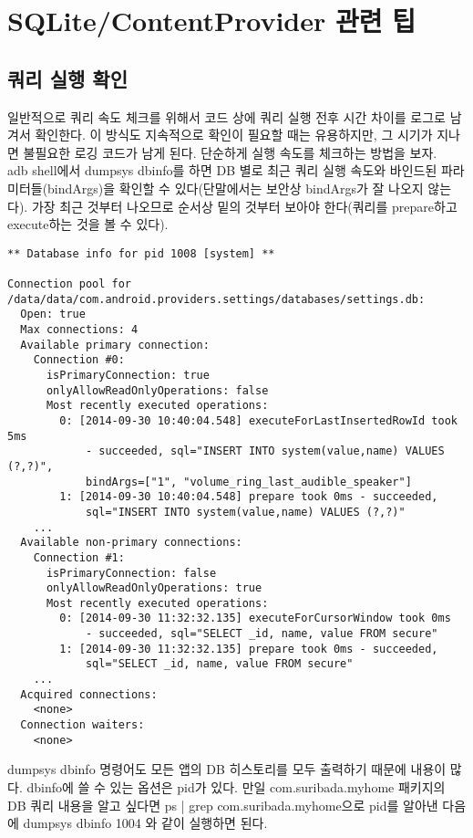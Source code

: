 \section{SQLite/ContentProvider 관련 팁}
\subsection{쿼리 실행 확인}
일반적으로 쿼리 속도 체크를 위해서 코드 상에 쿼리 실행 전후 시간 차이를 로그로 남겨서 확인한다. 이 방식도 지속적으로 확인이 필요할 때는 유용하지만, 그 시기가 지나면 불필요한 로깅 코드가 남게 된다.
단순하게 실행 속도를 체크하는 방법을 보자.\\

adb shell에서 dumpsys dbinfo를 하면 DB 별로 최근 쿼리 실행 속도와 바인드된 파라미터들(bindArgs)을 확인할 수 있다(단말에서는 보안상 bindArgs가 잘 나오지 않는다).
가장 최근 것부터 나오므로 순서상 밑의 것부터 보아야 한다(쿼리를 prepare하고 execute하는 것을 볼 수 있다).

\begin{lstlisting}[frame=single] 
** Database info for pid 1008 [system] **

Connection pool for /data/data/com.android.providers.settings/databases/settings.db:
  Open: true
  Max connections: 4
  Available primary connection:
    Connection #0:
      isPrimaryConnection: true
      onlyAllowReadOnlyOperations: false
      Most recently executed operations:
        0: [2014-09-30 10:40:04.548] executeForLastInsertedRowId took 5ms 
        	- succeeded, sql="INSERT INTO system(value,name) VALUES (?,?)", 
			bindArgs=["1", "volume_ring_last_audible_speaker"]
        1: [2014-09-30 10:40:04.548] prepare took 0ms - succeeded, 
        	sql="INSERT INTO system(value,name) VALUES (?,?)"
	...
  Available non-primary connections:
    Connection #1:
      isPrimaryConnection: false
      onlyAllowReadOnlyOperations: true
      Most recently executed operations:
        0: [2014-09-30 11:32:32.135] executeForCursorWindow took 0ms 
        	- succeeded, sql="SELECT _id, name, value FROM secure"
        1: [2014-09-30 11:32:32.135] prepare took 0ms - succeeded, 
        	sql="SELECT _id, name, value FROM secure"
	...
  Acquired connections:
    <none>
  Connection waiters:
    <none>
\end{lstlisting}
dumpsys dbinfo 명령어도 모든 앱의 DB 히스토리를 모두 출력하기 때문에 내용이 많다. dbinfo에 쓸 수 있는 옵션은 pid가 있다. 만일 com.suribada.myhome 패키지의 DB 쿼리 내용을 알고 싶다면 ps | grep com.suribada.myhome으로 pid를 알아낸 다음에 dumpsys dbinfo 1004 와 같이 실행하면 된다.\\

